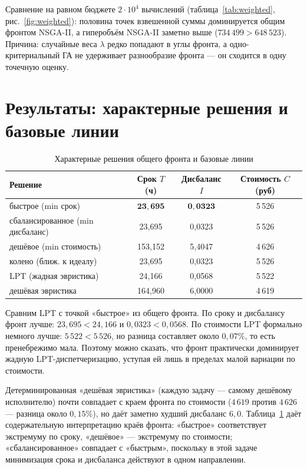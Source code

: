 \documentclass[12pt,a4paper]{article}
\begin{document}
Сравнение на равном бюджете $2\cdot 10^4$ вычислений (таблица~\ref{tab:weighted},
рис.~\ref{fig:weighted}): половина точек взвешенной суммы доминируется
общим фронтом NSGA-II, а гиперобъём NSGA-II заметно выше
($734\,499 > 648\,523$). Причина: случайные веса $\lambda$ редко
попадают в углы фронта, а одно-критериальный ГА не удерживает разнообразие
фронта --- он сходится в одну точечную оценку.

\section{Результаты: характерные решения и базовые линии}

\begin{table}[H]
\centering
\small
\caption{Характерные решения общего фронта и базовые линии}
\label{tab:reps}
\begin{tabular}{lccc}
\toprule
Решение & Срок $T$ (ч) & Дисбаланс $I$ & Стоимость $C$ (руб) \\
\midrule
быстрое (min срок) & $\mathbf{23{,}695}$ & $\mathbf{0{,}0323}$ & 5\,526 \\
сбалансированное (min дисбаланс) & 23{,}695 & 0{,}0323 & 5\,526 \\
дешёвое (min стоимость) & 153{,}152 & 5{,}4047 & 4\,626 \\
колено (ближ. к идеалу) & 23{,}695 & 0{,}0323 & 5\,526 \\
\midrule
LPT (жадная эвристика) & 24{,}166 & 0{,}0568 & 5\,522 \\
дешёвая эвристика & 164{,}960 & 6{,}0000 & 4\,619 \\
\bottomrule
\end{tabular}
\end{table}

Сравним LPT с точкой «быстрое» из общего фронта. По сроку и дисбалансу
фронт лучше: $23{,}695 < 24{,}166$ и $0{,}0323 < 0{,}0568$. По стоимости
LPT формально немного лучше: $5\,522 < 5\,526$, но разница составляет
около $0{,}07\%$, то есть пренебрежимо мала. Поэтому можно сказать, что
фронт практически доминирует жадную LPT-диспетчеризацию, уступая ей лишь
в пределах малой вариации по стоимости.

Детерминированная «дешёвая эвристика» (каждую задачу --- самому дешёвому
исполнителю) почти совпадает с краем фронта по стоимости
($4\,619$ против $4\,626$ --- разница около $0{,}15\%$), но даёт заметно
худший дисбаланс $6{,}0$. Таблица~\ref{tab:reps} даёт содержательную
интерпретацию краёв фронта: «быстрое» соответствует экстремуму по сроку,
«дешёвое» --- экстремуму по стоимости; «сбалансированное» совпадает с
«быстрым», поскольку в этой задаче минимизация срока и дисбаланса
действуют в одном направлении.
\end{document}

